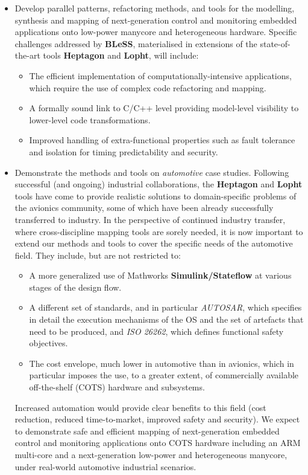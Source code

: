 \documentclass[a4paper,11pt]{article}
\newcommand{\project}[1]{\textbf{#1}\xspace}
\newcommand{\BLESS}{\project{BLeSS}}
\newcommand{\TheProject}{\BLESS}
\begin{document}
\begin{itemize}
\item Develop parallel patterns, refactoring methods, and tools for
  the modelling, synthesis and mapping of next-generation control and
  monitoring embedded applications onto low-power manycore and
  heterogeneous hardware. Specific challenges addressed by \TheProject{},
  materialised in extensions of the state-of-the-art tools \textbf{Heptagon}
  and \textbf{Lopht}, will include:
  \begin{itemize}
  \item The efficient implementation of computationally-intensive
    applications, which require the use of complex code refactoring
    and mapping. 
  \item A formally sound link to C/C++ level providing model-level
    visibility to lower-level code transformations.
  \item Improved handling of extra-functional properties such as fault
    tolerance and isolation for timing predictability and security.
  \end{itemize}
  
\item Demonstrate the methods and tools on {\em automotive} case
  studies. Following successful (and ongoing) industrial
  collaborations, the \textbf{Heptagon} and \textbf{Lopht} tools have come to provide
  realistic solutions to domain-specific problems of the avionics
  community, some of which have been already successfully transferred
  to industry. In the perspective of continued industry transfer,
  where cross-discipline mapping tools are sorely needed, it is now
  important to extend our methods and tools to cover the specific
  needs of the automotive field. They include, but are not restricted
  to:
  \begin{itemize}
  \item A more generalized use of Mathworks \textbf{Simulink/Stateflow} at
    various stages of the design flow.
  \item A different set of standards, and in particular \emph{AUTOSAR}, which
    specifies in detail the execution mechanisms of the OS and the set
    of artefacts that need to be produced, and \emph{ISO 26262}, which defines
    functional safety objectives.
  \item The cost envelope, much lower in automotive than in avionics,
    which in particular imposes the use, to a greater extent, of
    commercially available off-the-shelf (COTS) hardware and
    subsystems.
  \end{itemize}
  Increased automation would provide clear benefits to this field
  (cost reduction, reduced time-to-market, improved safety and
  security). We expect to demonstrate safe and efficient mapping of
  next-generation embedded control and monitoring applications onto
  COTS hardware including an ARM multi-core and a next-generation
  low-power and heterogeneous manycore, under real-world automotive
  industrial scenarios.

\end{itemize}
\end{document}
